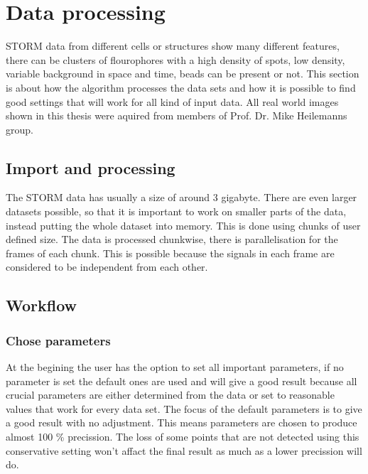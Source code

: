 \chapter{Data processing}
STORM data from different cells or structures show many different features, there can be clusters of flourophores with a high density of spots, low density, variable background in space and time, beads can be present or not. This section is about how the algorithm processes the data sets and how it is possible to find good settings that will work for all kind of input data.\newline
All real world images shown in this thesis were aquired from members of Prof. Dr. Mike Heilemanns group.


\section{Import and processing}
The STORM data has usually a size of around 3 gigabyte. There are even larger datasets possible, so that it is important to work on smaller parts of the data, instead putting the whole dataset into memory. This is done using chunks of user defined size. The data is processed chunkwise, there is parallelisation for the frames of each chunk. This is possible because the signals in each frame are considered to be independent from each other.  

\section{Workflow}
\subsection{Chose parameters}
At the begining the user has the option to set all important parameters, if no parameter is set the default ones are used and will give a good result because all crucial parameters are either determined from the data or set to reasonable values that work for every data set. The focus of the default parameters is to give a good result with no adjustment. This means parameters are chosen to produce almost 100 \% precission. The loss of some points that are not detected using this conservative setting won't affact the final result as much as a lower precission will do.
